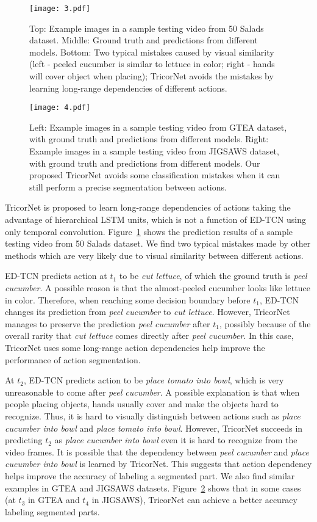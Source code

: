 \documentclass{article}
\begin{document}
\begin{figure}[t]
\centering
\texttt{[image: 3.pdf]}
\caption{Top: Example images in a sample testing video from 50 Salads dataset. Middle: Ground truth and predictions from different models. Bottom: Two typical mistakes caused by visual similarity (left - peeled cucumber is similar to lettuce in color; right - hands will cover object when placing); TricorNet avoids the mistakes by learning long-range dependencies of different actions.}
\label{f3}
\end{figure}

\begin{figure}[t]
\centering
\texttt{[image: 4.pdf]}
\caption{Left: Example images in a sample testing video from GTEA dataset, with ground truth and predictions from different models. Right: Example images in a sample testing video from JIGSAWS dataset, with ground truth and predictions from different models. Our proposed TricorNet avoids some classification mistakes when it can still perform a precise segmentation between actions.}
\label{f4}
\end{figure}

TricorNet is proposed to learn long-range dependencies of actions taking the advantage of hierarchical LSTM units, which is not a function of ED-TCN using only temporal convolution. Figure~\ref{f3} shows the prediction results of a sample testing video from 50 Salads dataset. We find two typical mistakes made by other methods which are very likely due to visual similarity between different actions. 

ED-TCN predicts action at $t_1$ to be \textit{cut lettuce}, of which the ground truth is \textit{peel cucumber}. A possible reason is that the almost-peeled cucumber looks like lettuce in color. Therefore, when reaching some decision boundary before $t_1$, ED-TCN changes its prediction from \textit{peel cucumber} to \textit{cut lettuce}. However, TricorNet manages to preserve the prediction \textit{peel cucumber} after $t_1$, possibly because of the overall rarity that \textit{cut lettuce} comes directly after \textit{peel cucumber}. In this case, TricorNet uses some long-range action dependencies help improve the performance of action segmentation.

At $t_2$, ED-TCN predicts action to be \textit{place tomato into bowl}, which is very unreasonable to come after \textit{peel cucumber}. A possible explanation is that when people placing objects, hands usually cover and make the objects hard to recognize. Thus, it is hard to visually distinguish between actions such as \textit{place cucumber into bowl} and \textit{place tomato into bowl}. However, TricorNet succeeds in predicting $t_2$ as  \textit{place cucumber into bowl} even it is hard to recognize from the video frames. It is possible that the dependency between \textit{peel cucumber} and \textit{place cucumber into bowl} is learned by TricorNet. This suggests that action dependency helps improve the accuracy of labeling a segmented part. We also find similar examples in GTEA and JIGSAWS datasets. Figure~\ref{f4} shows that in some cases (at $t_3$ in GTEA and $t_4$ in JIGSAWS), TricorNet can achieve a better accuracy labeling segmented parts. 
\end{document}
